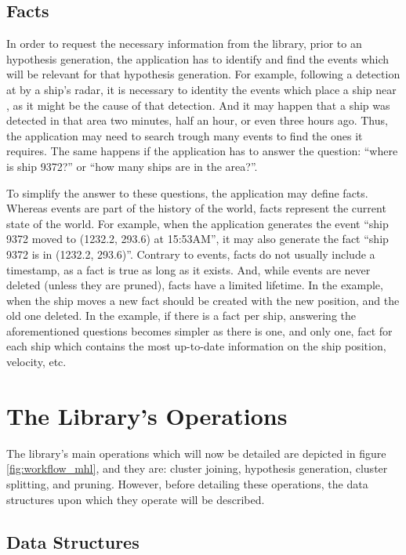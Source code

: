 \subsection{Facts}

In order to request the necessary information from the library, prior to an hypothesis generation, the application has to identify and find the events which will be relevant for that hypothesis generation. For example, following a detection at  by a ship's radar, it is necessary to identity the events which place a ship near , as it might be the cause of that detection. And it may happen that a ship was detected in that area two minutes, half an hour, or even three hours ago. Thus, the application may need to search trough many events to find the ones it requires. The same happens if the application has to answer the question: ``where is ship 9372?'' or ``how many ships are in the  area?''.

To simplify the answer to these questions, the application may define facts. Whereas events are part of the history of the world, facts represent the current state of the world. For example, when the application generates the event ``ship 9372 moved to (1232.2, 293.6) at 15:53AM'', it may also generate the fact ``ship 9372 is in (1232.2, 293.6)''. Contrary to events, facts do not usually include a timestamp, as a fact is true as long as it exists. And, while events are never deleted (unless they are pruned), facts have a limited lifetime. In the example, when the ship moves a new fact should be created with the new position, and the old one deleted. In the example, if there is a fact per ship, answering the aforementioned questions becomes simpler as there is one, and only one, fact for each ship which contains the most up-to-date information on the ship position, velocity, etc.


\section{The Library's Operations}
\label{sec:library_operations}

The library's main operations which will now be detailed are depicted in figure \ref{fig:workflow_mhl}, and they are: cluster joining, hypothesis generation, cluster splitting, and pruning. However, before detailing these operations, the data structures upon which they operate will be described.

\subsection{Data Structures}
\label{sec:operations_detail}

